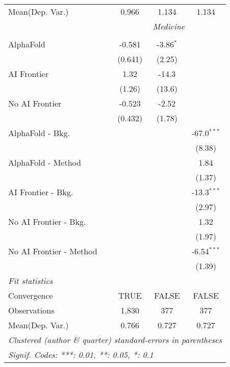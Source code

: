 \begin{tabular}{lccc}
Mean(Dep. Var.) & 0.966 & 1.134 & 1.134 \\
 & \multicolumn{3}{c}{\textit{Medicine}} \\ \\
   AlphaFold               & -0.581  & -3.86$^{*}$ &   \\   
                           & (0.641) & (2.25)      &   \\   
   AI Frontier             & 1.32    & -14.3       &   \\   
                           & (1.26)  & (13.6)      &   \\   
   No AI Frontier          & -0.523  & -2.52       &   \\   
                           & (0.432) & (1.78)      &   \\   
   AlphaFold - Bkg.        &         &             & -67.0$^{***}$\\   
                           &         &             & (8.38)\\   
   AlphaFold - Method      &         &             & 1.84\\   
                           &         &             & (1.37)\\   
   AI Frontier - Bkg.      &         &             & -13.3$^{***}$\\   
                           &         &             & (2.97)\\   
   No AI Frontier - Bkg.   &         &             & 1.32\\   
                           &         &             & (1.97)\\   
   No AI Frontier - Method &         &             & -6.54$^{***}$\\   
                           &         &             & (1.39)\\   
   \midrule
   \emph{Fit statistics}\\
   Convergence             &TRUE     & FALSE       & FALSE\\  
   Observations            & 1,830   & 377         & 377\\  
Mean(Dep. Var.) & 0.766 & 0.727 & 0.727 \\
   \midrule \midrule
   \multicolumn{4}{l}{\emph{Clustered (author \& quarter) standard-errors in parentheses}}\\
   \multicolumn{4}{l}{\emph{Signif. Codes: ***: 0.01, **: 0.05, *: 0.1}}\\
\end{tabular}
\par\endgroup
